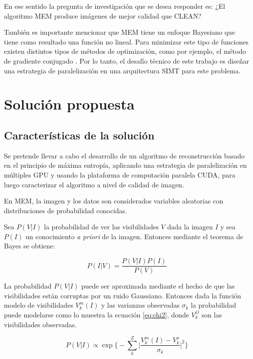 En ese sentido la pregunta de investigación que se desea responder es: ¿El algoritmo MEM produce imágenes de mejor calidad que CLEAN?

También es importante mencionar que MEM tiene un enfoque Bayesiano que tiene como resultado una función no lineal. Para minimizar este tipo de funciones existen distintos tipos de métodos de optimización, como por ejemplo, el método de gradiente conjugado \cite{ncg}. Por lo tanto, el desafío técnico de este trabajo es diseñar una estrategia de paralelización en una arquitectura SIMT para este problema.



\section{Soluci\'on propuesta}
\label{intro:solucion}
\subsection{Características de la solución}
\label{subsec:caracteristicas}
Se pretende llevar a cabo el desarrollo de un algoritmo de reconstrucción basado en el principio de máxima entropía, aplicando una estrategia de paralelización en múltiples GPU y usando la plataforma de computación paralela CUDA, para luego caracterizar el algoritmo a nivel de calidad de imagen.

En MEM, la imagen y los datos son considerados variables aleatorias con distribuciones de probabilidad conocidas.

Sea $P(V|I)$ la probabilidad de ver las visibilidades $V$ dada la imagen $I$ y sea $P(I)$ un conocimiento \textit{a priori} de la imagen. Entonces mediante el teorema de Bayes se obtiene:

\begin{equation}
P(I|V) = \frac{P(V|I)P(I)}{P(V)}
\label{eq:bayes}
\end{equation}	

La probabilidad $P(V|I)$ puede ser aproximada mediante el hecho de que las visibilidades están corruptas por un ruido Gaussiano. Entonces dada la función modelo de visibilidades $V_{k}^{m}(I)$ y las varianzas observadas $\sigma_k$ la probabilidad puede modelarse como lo muestra la ecuación \ref{eq:chi2}, donde $V_{k}^{O}$ son las visibilidades observadas.

\begin{equation}
 P(V|I) \propto \exp\biggl\{-\sum_k^{Z}{\biggl|\frac{V^m_k(I)-V^o_k}{\sigma_k}}\biggr|^2\biggr\}
 \label{eq:chi2}
\end{equation} 

